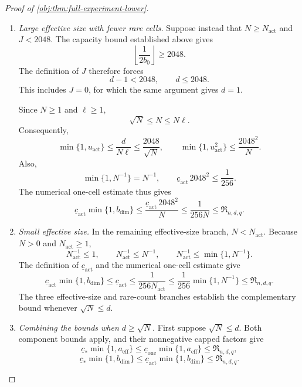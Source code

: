 \documentclass[11pt]{article}
\begin{document}
\begin{proof}[Proof of \cref{obj:thm:full-experiment-lower}]
\begin{enumerate}
\item \emph{Large effective size with fewer rare cells.}
Suppose instead that \(N\ge N_{\mathrm{act}}\) and \(J<2048\).
The capacity bound established above gives
\[
\left\lfloor\frac1{2b_0}\right\rfloor\ge2048.
\]
The definition of \(J\) therefore forces
\[
d-1<2048,\qquad d\le2048.
\]
This includes \(J=0\), for which the same argument gives \(d=1\).

Since \(N\ge1\) and \(\ell\ge1\),
\[
\sqrt N\le N\le N\ell.
\]
Consequently,
\[
\min\{1,u_{\mathrm{act}}\}
\le\frac{d}{N\ell}
\le\frac{2048}{\sqrt N},
\qquad
\min\{1,u_{\mathrm{act}}^2\}
\le\frac{2048^2}{N}.
\]
Also,
\[
\min\{1,N^{-1}\}=N^{-1},
\qquad
\underline c_{\mathrm{act}}\,2048^2\le\frac1{256}.
\]
The numerical one-cell estimate thus gives
\[
\underline c_{\mathrm{act}}\min\{1,b_{\mathrm{dim}}\}
\le
\frac{\underline c_{\mathrm{act}}\,2048^2}{N}
\le\frac1{256N}
\le\mathfrak R_{n,d,q}.
\]

\item \emph{Small effective size.}
In the remaining effective-size branch, \(N<N_{\mathrm{act}}\).
Because \(N>0\) and \(N_{\mathrm{act}}\ge1\),
\[
N_{\mathrm{act}}^{-1}\le1,\qquad
N_{\mathrm{act}}^{-1}\le N^{-1},
\qquad
N_{\mathrm{act}}^{-1}\le\min\{1,N^{-1}\}.
\]
The definition of \(\underline c_{\mathrm{act}}\) and the numerical
one-cell estimate give
\[
\underline c_{\mathrm{act}}\min\{1,b_{\mathrm{dim}}\}
\le\underline c_{\mathrm{act}}
\le\frac1{256N_{\mathrm{act}}}
\le\frac1{256}\min\{1,N^{-1}\}
\le\mathfrak R_{n,d,q}.
\]
The three effective-size and rare-count branches establish the complementary
bound whenever \(\sqrt N\le d\).

\item \emph{Combining the bounds when \(d\ge\sqrt N\).}
First suppose \(\sqrt N\le d\). Both component bounds apply, and their
nonnegative capped factors give
\[
\underline c_*\min\{1,a_{\mathrm{eff}}\}
\le
\underline c_{\mathrm{one}}\min\{1,a_{\mathrm{eff}}\}
\le\mathfrak R_{n,d,q},
\]
\[
\underline c_*\min\{1,b_{\mathrm{dim}}\}
\le
\underline c_{\mathrm{act}}\min\{1,b_{\mathrm{dim}}\}
\le\mathfrak R_{n,d,q}.
\]


\end{enumerate}
\end{proof}
\end{document}
